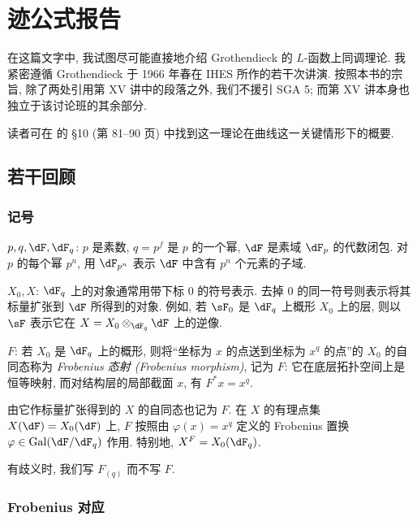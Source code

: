 
\chapter[迹公式报告 {[Rapport]}]{迹公式报告}\label{II}

在这篇文字中, 我试图尽可能直接地介绍 Grothendieck 的 $L$-函数上同调理论. 我紧密遵循 Grothendieck 于 1966 年春在 IHES 所作的若干次讲演. 按照本书的宗旨, 除了两处引用第 XV 讲中的段落之外, 我们不援引 SGA 5; 而第 XV 讲本身也独立于该讨论班的其余部分.

读者可在 \cite{de73} 的 \S 10 (第 81--90 页) 中找到这一理论在曲线这一关键情形下的概要.



\section{若干回顾}\label{II:1}

\subsection{记号}\label{II:1-1}

$p,q,\dF,\dF_q$: $p$ 是素数, $q=p^f$ 是 $p$ 的一个幂, $\dF$ 是素域 $\dF_p$ 的代数闭包. 对 $p$ 的每个幂 $p^n$, 用 $\dF_{p^n}$ 表示 $\dF$ 中含有 $p^n$ 个元素的子域.

$X_0,X$: $\dF_q$ 上的对象通常用带下标 $0$ 的符号表示. 去掉 $0$ 的同一符号则表示将其标量扩张到 $\dF$ 所得到的对象. 例如, 若 $\sF_0$ 是 $\dF_q$ 上概形 $X_0$ 上的层, 则以 $\sF$ 表示它在 $X=X_0\otimes_{\dF_q} \dF$ 上的逆像.

$F$: 若 $X_0$ 是 $\dF_q$ 上的概形, 则将“坐标为 $x$ 的点送到坐标为 $x^q$ 的点”的 $X_0$ 的自同态称为 \emph{Frobenius 态射 (Frobenius morphism)}, 记为 $F$: 它在底层拓扑空间上是恒等映射, 而对结构层的局部截面 $x$, 有 $F^* x = x^q$.

由它作标量扩张得到的 $X$ 的自同态也记为 $F$. 在 $X$ 的有理点集 $X(\dF) = X_0(\dF)$ 上, $F$ 按照由 $\varphi(x)=x^q$ 定义的 Frobenius 置换 $\varphi\in\gal(\dF/\dF_q)$ 作用. 特别地, $X^F=X_0(\dF_q)$.

有歧义时, 我们写 $F_{(q)}$ 而不写 $F$.

\subsection{Frobenius 对应}\label{II:1-2}

